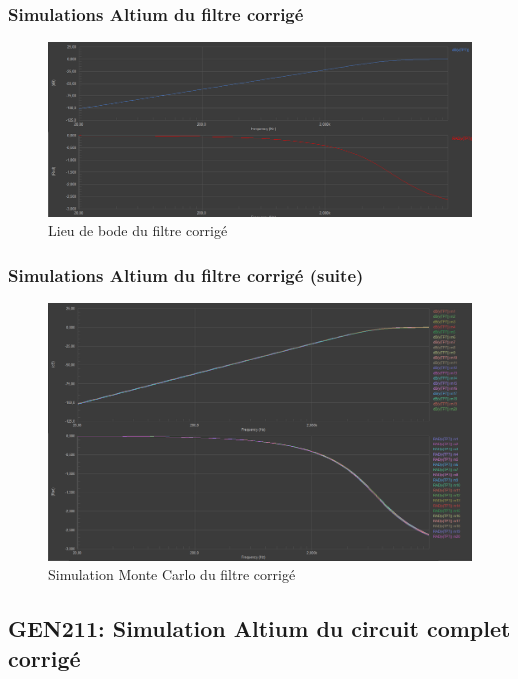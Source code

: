 \documentclass[10pt]{beamer}\usepackage[]{graphicx}\usepackage[]{xcolor}
\begin{document}

\begin{frame}
\frametitle{Simulations Altium du filtre corrigé}
\begin{figure}
\centering
\includegraphics[width=.8\textwidth]{figure/altium-bode-filter.png}
\caption{Lieu de bode du filtre corrigé}
\label{fig:altium-bode-filter}
\end{figure}
\end{frame}

\begin{frame}
\frametitle{Simulations Altium du filtre corrigé (suite)}
\begin{figure}
\centering
\includegraphics[width=.8\textwidth]{figure/altium-monte-carlo-filter.png}
\caption{Simulation Monte Carlo du filtre corrigé}
\label{fig:altium-monte-carlo-filter}
\end{figure}
\end{frame}


\subsection{GEN211: Simulation Altium du circuit complet corrigé}

\end{document}
